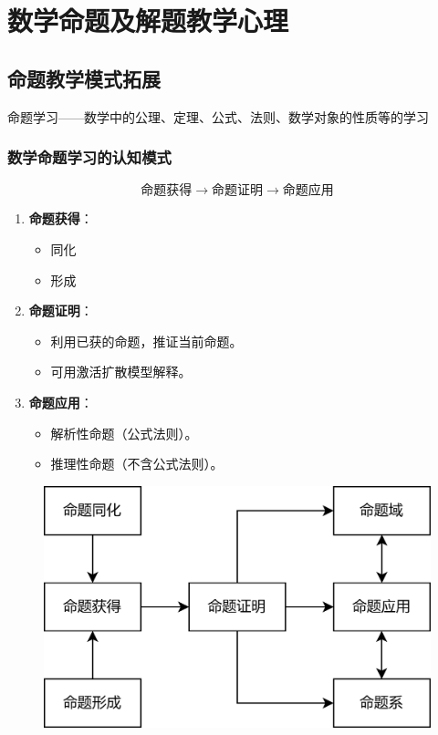 \chapter{数学命题及解题教学心理}

\section{命题教学模式拓展}

命题学习——数学中的公理、定理、公式、法则、数学对象的性质等的学习

\subsection{数学命题学习的认知模式}

\[
\text{命题获得}\xrightarrow{}\text{命题证明}\xrightarrow{}\text{命题应用}
\]


\begin{enumerate}
    \item \textbf{命题获得}：
    \begin{itemize}
        \item 同化
        \item 形成
    \end{itemize}

    \item \textbf{命题证明}：
    \begin{itemize}
        \item 利用已获的命题，推证当前命题。
        \item 可用激活扩散模型解释。
    \end{itemize}

    \item \textbf{命题应用}：
    \begin{itemize}
        \item 解析性命题（公式法则）。
        \item 推理性命题（不含公式法则）。
    \end{itemize}
\end{enumerate}

\begin{figure}[H]
    \centering
    \includegraphics[width=0.45\linewidth]{image/数学命题学习过程.png}
\end{figure}



